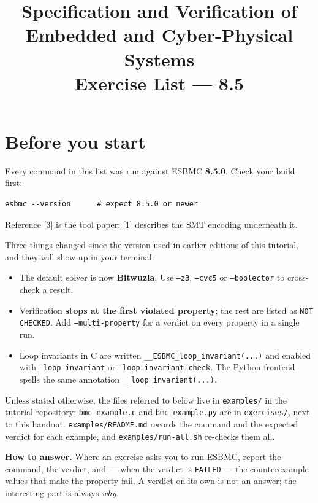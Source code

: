 \documentclass[11pt,a4paper]{article}
\title{\vspace{-1.5cm}Specification and Verification of\\Embedded and Cyber-Physical Systems\\[4pt]
       \large Exercise List --- \esbmc{} 8.5}
\author{}
\date{}
\newcommand{\esbmc}{ESBMC}
\newcommand{\flag}[1]{\texttt{\small #1}}
\newcommand{\file}[1]{\texttt{\small #1}}
\begin{document}
\maketitle
\vspace{-1.6cm}

\section*{Before you start}

Every command in this list was run against \esbmc{} \textbf{8.5.0}. Check your
build first:

\begin{lstlisting}[style=sh]
esbmc --version      # expect 8.5.0 or newer
\end{lstlisting}

\noindent
Reference [3] is the tool paper; [1] describes the SMT encoding underneath it.

Three things changed since the version used in earlier editions of this
tutorial, and they will show up in your terminal:

\begin{itemize}[leftmargin=1.4em,itemsep=2pt]
  \item The default solver is now \textbf{Bitwuzla}. Use \flag{--z3},
        \flag{--cvc5} or \flag{--boolector} to cross-check a result.
  \item Verification \textbf{stops at the first violated property}; the rest
        are listed as \texttt{NOT CHECKED}. Add \flag{--multi-property} for a
        verdict on every property in a single run.
  \item Loop invariants in C are written \flag{\_\_ESBMC\_loop\_invariant(...)}
        and enabled with \flag{--loop-invariant} or
        \flag{--loop-invariant-check}. The Python frontend spells the same
        annotation \flag{\_\_loop\_invariant(...)}.
\end{itemize}

Unless stated otherwise, the files referred to below live in \file{examples/}
in the tutorial repository; \file{bmc-example.c} and \file{bmc-example.py} are
in \file{exercises/}, next to this handout. \file{examples/README.md} records
the command and the expected verdict for each example, and
\file{examples/run-all.sh} re-checks them all.

\medskip
\noindent
\textbf{How to answer.} Where an exercise asks you to run \esbmc{}, report the
command, the verdict, and --- when the verdict is \texttt{FAILED} --- the
counterexample values that make the property fail. A verdict on its own is not
an answer; the interesting part is always \emph{why}.
\end{document}
